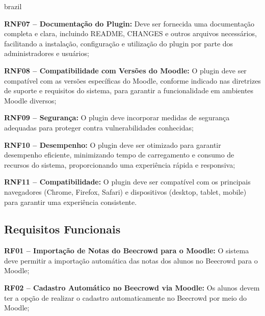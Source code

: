 \begin{otherlanguage*}{brazil}
    \vspace{12pt}

    \textbf{RNF07 – Documentação do Plugin:} Deve ser fornecida uma documentação completa e clara, incluindo README, CHANGES e outros arquivos necessários, facilitando a instalação, configuração e utilização do plugin por parte dos administradores e usuários;

    \vspace{12pt}

    \textbf{RNF08 – Compatibilidade com Versões do Moodle:} O plugin deve ser compatível com as versões específicas do Moodle, conforme indicado nas diretrizes de suporte e requisitos do sistema, para garantir a funcionalidade em ambientes Moodle diversos;

    \vspace{12pt}

    \textbf{RNF09 – Segurança:} O plugin deve incorporar medidas de segurança adequadas para proteger contra vulnerabilidades conhecidas;

    \vspace{12pt}

    \textbf{RNF10 – Desempenho:} O plugin deve ser otimizado para garantir desempenho eficiente, minimizando tempo de carregamento e consumo de recursos do sistema, proporcionando uma experiência rápida e responsiva;

    \vspace{12pt}

    \textbf{RNF11 – Compatibilidade:} O plugin deve ser compatível com os principais navegadores (Chrome, Firefox, Safari) e dispositivos (desktop, tablet, mobile) para garantir uma experiência consistente.

    \subsection{Requisitos Funcionais}

    \textbf{RF01 – Importação de Notas do Beecrowd para o Moodle:} O sistema deve permitir a importação automática das notas dos alunos no Beecrowd para o Moodle;

    \vspace{12pt}

    \textbf{RF02 – Cadastro Automático no Beecrowd via Moodle:} Os alunos devem ter a opção de realizar o cadastro automaticamente no Beecrowd por meio do Moodle;

    \vspace{12pt}


\end{otherlanguage*}
